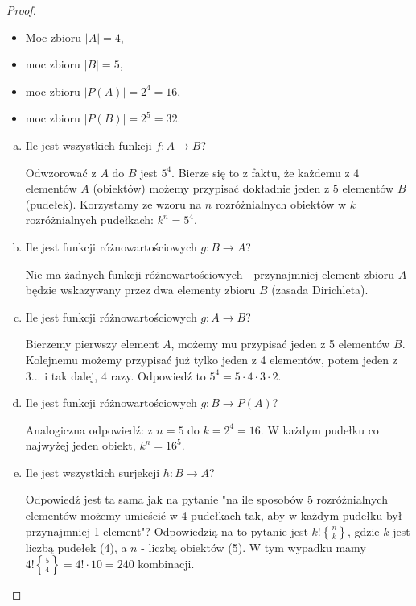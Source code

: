 \documentclass[11pt]{article}
\theoremstyle{definition}
\numberwithin{zadanie}{subsection}
\begin{document}
\begin{proof}
    \begin{itemize}
        \item Moc zbioru $|A| = 4$,
        \item moc zbioru $|B| = 5$,
        \item moc zbioru $|P(A)| = 2^4 = 16$,
        \item moc zbioru $|P(B)| = 2^5=32$.
    \end{itemize}
    \begin{enumerate}[a)]
        \item Ile jest wszystkich funkcji $f: A \to B$?

              Odwzorować z $A$ do $B$ jest $5^4$. Bierze się to z faktu, że każdemu z $4$ elementów $A$ (obiektów) możemy przypisać dokładnie jeden z $5$ elementów $B$ (pudełek). Korzystamy ze wzoru na $n$ rozróżnialnych obiektów w $k$ rozróżnialnych pudełkach: $k^n = 5^4$.

        \item Ile jest funkcji różnowartościowych $g: B \to A$?

              Nie ma żadnych funkcji różnowartościowych - przynajmniej element zbioru $A$ będzie wskazywany przez dwa elementy zbioru $B$ (zasada Dirichleta).

        \item Ile jest funkcji różnowartościowych $g: A \to B$?

              Bierzemy pierwszy element $A$, możemy mu przypisać jeden z 5 elementów $B$. Kolejnemu możemy przypisać już tylko jeden z 4 elementów, potem jeden z 3... i tak dalej, 4 razy. Odpowiedź to $5^{\underbar{4}} = 5\cdot4\cdot3\cdot2$.

        \item Ile jest funkcji różnowartościowych $g: B \to P(A)$?

              Analogiczna odpowiedź: z $n=5$ do $k=2^4=16$. W każdym pudełku co najwyżej jeden obiekt, $k^{\underbar n} = 16^{\underbar 5}$.

        \item Ile jest wszystkich surjekcji $h: B \to A$?

              Odpowiedź jest ta sama jak na pytanie "na ile sposobów 5 rozróżnialnych elementów możemy umieścić w 4 pudełkach tak, aby w każdym pudełku był przynajmniej 1 element"? Odpowiedzią na to pytanie jest $k!{n\brace k}$, gdzie $k$ jest liczbą pudełek (4), a $n$ - liczbą obiektów (5). W tym wypadku mamy $4!{5\brace 4} = 4!\cdot10 = 240$ kombinacji.


\end{enumerate}
\end{proof}
\end{document}
